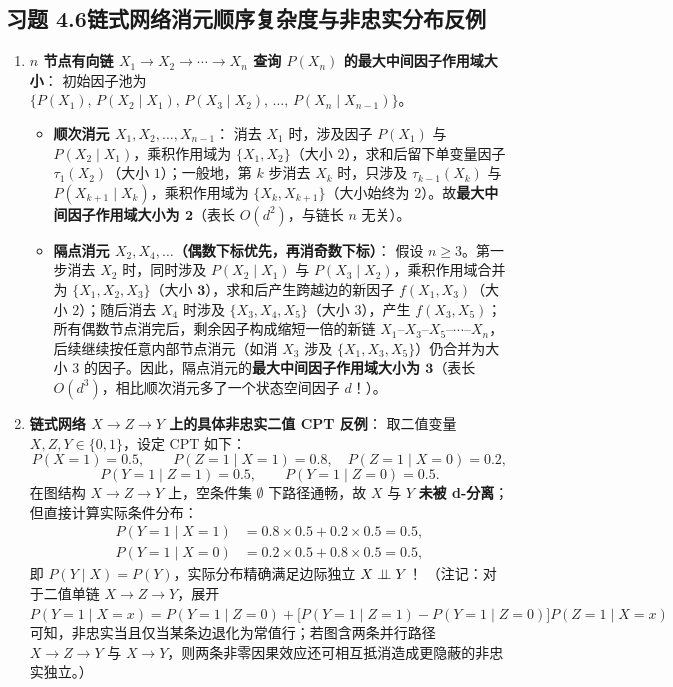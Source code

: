 \subsection*{习题 4.6\quad 链式网络消元顺序复杂度与非忠实分布反例}
\begin{enumerate}[label=(\arabic*), leftmargin=1.8em]
  \item \textbf{$n$ 节点有向链 $X_1 \to X_2 \to \cdots \to X_n$ 查询 $P(X_n)$ 的最大中间因子作用域大小}：
  初始因子池为 $\{P(X_1),\, P(X_2\mid X_1),\, P(X_3\mid X_2),\, \dots,\, P(X_n\mid X_{n-1})\}$。
  \begin{itemize}
    \item \textbf{顺次消元 $X_1, X_2, \dots, X_{n-1}$}：
    消去 $X_1$ 时，涉及因子 $P(X_1)$ 与 $P(X_2\mid X_1)$，乘积作用域为 $\{X_1, X_2\}$（大小 $2$），求和后留下单变量因子 $\tau_1(X_2)$（大小 $1$）；一般地，第 $k$ 步消去 $X_k$ 时，只涉及 $\tau_{k-1}(X_k)$ 与 $P(X_{k+1}\mid X_k)$，乘积作用域为 $\{X_k, X_{k+1}\}$（大小始终为 $2$）。故\textbf{最大中间因子作用域大小为 $\mathbf{2}$}（表长 $O(d^2)$，与链长 $n$ 无关）。
    \item \textbf{隔点消元 $X_2, X_4, \dots$（偶数下标优先，再消奇数下标）}：
    假设 $n \ge 3$。第一步消去 $X_2$ 时，同时涉及 $P(X_2\mid X_1)$ 与 $P(X_3\mid X_2)$，乘积作用域合并为 $\{X_1, X_2, X_3\}$（大小 $\mathbf{3}$），求和后产生跨越边的新因子 $f(X_1, X_3)$（大小 $2$）；随后消去 $X_4$ 时涉及 $\{X_3, X_4, X_5\}$（大小 $3$），产生 $f(X_3, X_5)$；所有偶数节点消完后，剩余因子构成缩短一倍的新链 $X_1\text{--}X_3\text{--}X_5\text{--}\cdots\text{--}X_n$，后续继续按任意内部节点消元（如消 $X_3$ 涉及 $\{X_1, X_3, X_5\}$）仍合并为大小 $3$ 的因子。因此，隔点消元的\textbf{最大中间因子作用域大小为 $\mathbf{3}$}（表长 $O(d^3)$，相比顺次消元多了一个状态空间因子 $d$！）。
  \end{itemize}
  \item \textbf{链式网络 $X \to Z \to Y$ 上的具体非忠实二值 CPT 反例}：
  取二值变量 $X, Z, Y \in \{0, 1\}$，设定 CPT 如下：
  \[
    P(X=1) = 0.5,\qquad
    P(Z=1 \mid X=1) = 0.8,\quad P(Z=1 \mid X=0) = 0.2,
  \]
  \[
    P(Y=1 \mid Z=1) = 0.5,\qquad P(Y=1 \mid Z=0) = 0.5.
  \]
  在图结构 $X \to Z \to Y$ 上，空条件集 $\emptyset$ 下路径通畅，故 $X$ 与 $Y$ \textbf{未被 d-分离}；但直接计算实际条件分布：
  \begin{align*}
    P(Y=1 \mid X=1) &= 0.8 \times 0.5 + 0.2 \times 0.5 = 0.5, \\
    P(Y=1 \mid X=0) &= 0.2 \times 0.5 + 0.8 \times 0.5 = 0.5,
  \end{align*}
  即 $P(Y \mid X) = P(Y)$，实际分布精确满足边际独立 $X \perp\!\!\!\perp Y$！
  （注记：对于二值单链 $X \to Z \to Y$，展开 $P(Y=1\mid X=x) = P(Y=1\mid Z=0) + \big[P(Y=1\mid Z=1)-P(Y=1\mid Z=0)\big]P(Z=1\mid X=x)$ 可知，非忠实当且仅当某条边退化为常值行；若图含两条并行路径 $X\to Z\to Y$ 与 $X\to Y$，则两条非零因果效应还可相互抵消造成更隐蔽的非忠实独立。）
\end{enumerate}

